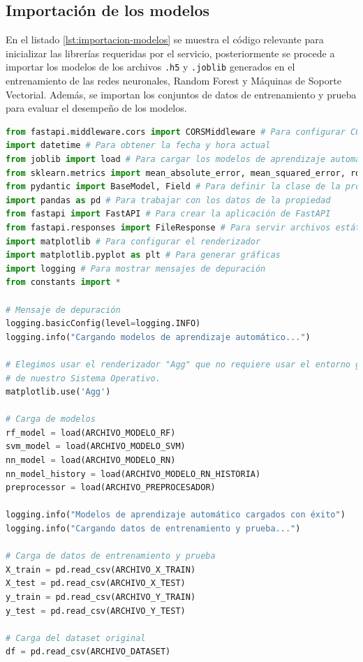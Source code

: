 \subsection{Importación de los modelos}
En el listado \ref{lst:importacion-modelos} se muestra el código relevante para
inicializar las librerías requeridas por el servicio, posteriormente se procede a
importar los modelos de los archivos \texttt{.h5} y \texttt{.joblib} generados en el
entrenamiento de las redes neuronales, Random Forest y Máquinas de Soporte Vectorial. Además,
se importan los conjuntos de datos de entrenamiento y prueba para evaluar el desempeño
de los modelos.

\begin{lstlisting}[language=python, caption={Importación de los modelos}, label={lst:importacion-modelos}]
from fastapi.middleware.cors import CORSMiddleware # Para configurar CORS
import datetime # Para obtener la fecha y hora actual
from joblib import load # Para cargar los modelos de aprendizaje automático
from sklearn.metrics import mean_absolute_error, mean_squared_error, root_mean_squared_error # Para calcular el error absoluto medio
from pydantic import BaseModel, Field # Para definir la clase de la propiedad y sus campos
import pandas as pd # Para trabajar con los datos de la propiedad
from fastapi import FastAPI # Para crear la aplicación de FastAPI
from fastapi.responses import FileResponse # Para servir archivos estáticos
import matplotlib # Para configurar el renderizador
import matplotlib.pyplot as plt # Para generar gráficas
import logging # Para mostrar mensajes de depuración
from constants import *

# Mensaje de depuración
logging.basicConfig(level=logging.INFO)
logging.info("Cargando modelos de aprendizaje automático...")

# Elegimos usar el renderizador "Agg" que no requiere usar el entorno gráfico
# de nuestro Sistema Operativo.
matplotlib.use('Agg')

# Carga de modelos
rf_model = load(ARCHIVO_MODELO_RF)
svm_model = load(ARCHIVO_MODELO_SVM)
nn_model = load(ARCHIVO_MODELO_RN)
nn_model_history = load(ARCHIVO_MODELO_RN_HISTORIA)
preprocessor = load(ARCHIVO_PREPROCESADOR)

logging.info("Modelos de aprendizaje automático cargados con éxito")
logging.info("Cargando datos de entrenamiento y prueba...")

# Carga de datos de entrenamiento y prueba
X_train = pd.read_csv(ARCHIVO_X_TRAIN)
X_test = pd.read_csv(ARCHIVO_X_TEST)
y_train = pd.read_csv(ARCHIVO_Y_TRAIN)
y_test = pd.read_csv(ARCHIVO_Y_TEST)

# Carga del dataset original
df = pd.read_csv(ARCHIVO_DATASET)
\end{lstlisting}

